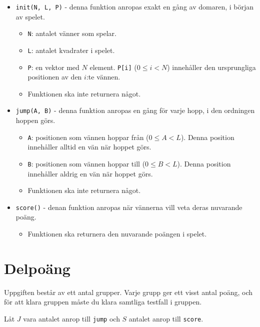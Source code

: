 \begin{itemize}
  \item \texttt{init(N, L, P)} - denna funktion anropas exakt en gång av domaren, i början av spelet.
  \begin{itemize}
    \item \texttt{N}: antalet vänner som spelar.
    \item \texttt{L}: antalet kvadrater i spelet.
    \item \texttt{P}: en vektor med $N$ element. \texttt{P[i]} ($0 \le i < N$) innehåller den ursprungliga
      positionen av den $i$:te vännen.
    \item Funktionen ska inte returnera något.
  \end{itemize}

  \item \texttt{jump(A, B)} - denna funktion anropas en gång för varje hopp, i den ordningen hoppen görs.
  \begin{itemize}
    \item \texttt{A}: positionen som vännen hoppar från 
      ($0 \le A < L$).
      Denna position innehåller alltid en vän när hoppet görs.
    \item \texttt{B}: positionen som vännen hoppar till
      ($0 \le B < L$).
      Denna position innehåller aldrig en vän när hoppet görs.
    \item Funktionen ska inte returnera något.
  \end{itemize}

  \item \texttt{score()} - denan funktion anropas när vännerna vill veta deras nuvarande poäng.
  \begin{itemize}
    \item Funktionen ska returnera den nuvarande poängen i spelet.
  \end{itemize}

\end{itemize}



\section*{Delpoäng}
Uppgiften består av ett antal grupper. Varje grupp ger ett visst antal poäng, och för att klara
gruppen måste du klara samtliga testfall i gruppen.

Låt $J$ vara antalet anrop till \texttt{jump} och $S$ antalet anrop till \texttt{score}.

